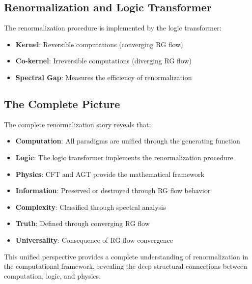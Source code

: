 \subsection{Renormalization and Logic Transformer}

\begin{theorem}
\label{thm:renorm-logic}
The renormalization procedure is implemented by the logic transformer:
\begin{itemize}
\item \textbf{Kernel}: Reversible computations (converging RG flow)
\item \textbf{Co-kernel}: Irreversible computations (diverging RG flow)
\item \textbf{Spectral Gap}: Measures the efficiency of renormalization
\end{itemize}
\end{theorem}

\subsection{The Complete Picture}

The complete renormalization story reveals that:

\begin{itemize}
\item \textbf{Computation}: All paradigms are unified through the generating function
\item \textbf{Logic}: The logic transformer implements the renormalization procedure
\item \textbf{Physics}: CFT and AGT provide the mathematical framework
\item \textbf{Information}: Preserved or destroyed through RG flow behavior
\item \textbf{Complexity}: Classified through spectral analysis
\item \textbf{Truth}: Defined through converging RG flow
\item \textbf{Universality}: Consequence of RG flow convergence
\end{itemize}

This unified perspective provides a complete understanding of renormalization in the computational framework, revealing the deep structural connections between computation, logic, and physics.

